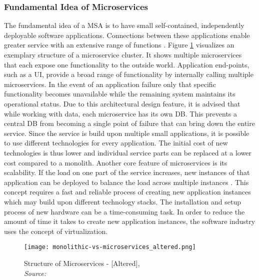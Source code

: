         \subsubsection{Fundamental Idea of Microservices}\label{sssec::micro}
        The fundamental idea of a \ac{MSA} is to have small self-contained, independently deployable software applications. Connections between these applications enable greater service with an extensive range of functions \cite{micro}. Figure \ref{fig::micro} visualizes an exemplary structure of a microservice cluster. It shows multiple microservices that each expose one functionality to the outside world. Application end-points, such as a \ac{UI}, provide a broad range of functionality by internally calling multiple microservices. In the event of an application failure only that specific functionality becomes unavailable while the remaining system maintains its operational status. Due to this architectural design feature, it is advised that while working with data, each microservice has its own \ac{DB}. This prevents a central \acl{DB} from becoming a single point of failure that can bring down the entire service. Since the service is build upon multiple small applications, it is possible to use different technologies for every application. The initial cost of new technologies is thus lower and individual service parts can be replaced at a lower cost compared to a monolith. Another core feature of microservices is its scalability. If the load on one part of the service increases, new instances of that application can be deployed to balance the load across multiple instances \cite{micro}. This concept requires a fast and reliable process of creating new application instances which may build upon different technology stacks.\newline
        The installation and setup process of new hardware can be a time-consuming task. In order to reduce the amount of time it takes to create new application instances, the software industry uses the concept of virtualization.

        \begin{figure}
            \centering
            \texttt{[image: monolithic-vs-microservices\_altered.png]}
            \caption{Structure of Microservices - [Altered], \\\textit{Source:~\cite{redhat_micro}}}\label{fig::micro}
        \end{figure}

